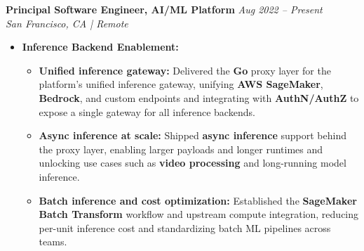 \vspace{0.15em}
\noindent\textbf{\sffamily Principal Software Engineer, AI/ML Platform} \hfill \textit{Aug 2022 -- Present} \\
 \hfill \textit{San Francisco, CA | Remote}
\vspace{0.05em}

\begin{itemize}[leftmargin=1.25em, topsep=1pt, partopsep=1.5pt]
\setlength\itemsep{0.22em}

\item \textbf{Inference Backend Enablement:}
    \begin{itemize}[leftmargin=2.25em]
        \setlength\itemsep{0.2em}
        \item \textbf{Unified inference gateway:} Delivered the \textbf{Go} proxy layer for the platform's unified inference gateway, unifying \textbf{AWS SageMaker}, \textbf{Bedrock}, and custom endpoints and integrating with \textbf{AuthN/AuthZ} to expose a single gateway for all inference backends.
        \item \textbf{Async inference at scale:} Shipped \textbf{async inference} support behind the proxy layer, enabling larger payloads and longer runtimes and unlocking use cases such as \textbf{video processing} and long-running model inference.
        \item \textbf{Batch inference and cost optimization:} Established the \textbf{SageMaker Batch Transform} workflow and upstream compute integration, reducing per-unit inference cost and standardizing batch ML pipelines across teams.
    \end{itemize}
\vspace{0.4em}


\end{itemize}
